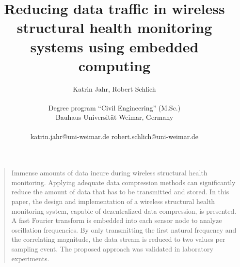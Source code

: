 \documentclass[12pt,a4paper]{scrartcl}
\title{\textsf\textbf{ \Large {Reducing data traffic in wireless structural health monitoring systems using embedded computing}}}
\author
{\large Katrin Jahr, Robert Schlich\\
\\
\normalsize{Degree program “Civil Engineering” (M.Sc.)}\\
\normalsize{Bauhaus-Universität Weimar, Germany}\\
\\
\normalsize{katrin.jahr@uni-weimar.de \qquad}
\normalsize{robert.schlich@uni-weimar.de}
}
\date{}
\newenvironment{sciabstract}{%
\begin{quote} \bfseries}
{\end{quote}}
\begin{document}
 


\baselineskip20pt


\maketitle 

% 
\setlength{\emergencystretch}{3pt}

\begin{sciabstract}

Immense amounts of data incure during wireless structural health monitoring.
Applying adequate data compression methods can significantly reduce the amount of data that has to be transmitted and stored.
In this paper, the design and implementation of a wireless structural health monitoring system, capable of dezentralized data compression, is presented. 
A fast Fourier transform is embedded into each sensor node to analyze oscillation frequencies. 
By only transmitting the first natural frequency and the correlating magnitude, the data stream is reduced to two values per sampling event.
The proposed approach was validated in laboratory experiments.



\end{sciabstract}

\end{document}
